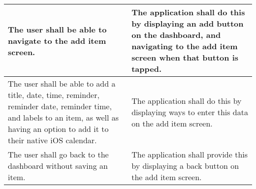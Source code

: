 \begin{table}[H]
\begin{tabular}{|p{7cm}|p{7cm}|}
        \hline
        The user shall be able to navigate to the add item screen.& The application shall do this by displaying an add button on the dashboard, and navigating to the add item screen when that button is tapped.\\
        \hline
        The user shall be able to add a title, date, time, reminder, reminder date, reminder time, and labels to an item, as well as having an option to add it to their native iOS calendar.& The application shall do this by displaying ways to enter this data on the add item screen.\\
        \hline
        The user shall go back to the dashboard without saving an item.& The application shall provide this by displaying a back button on the add item screen.\\
        \hline
    \end{tabular}
\end{table}

